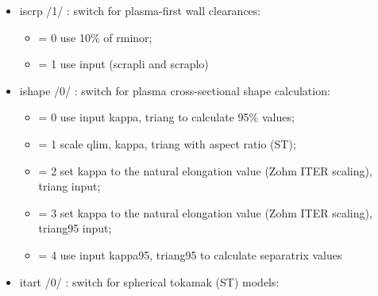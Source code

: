 \documentclass[]{article}
\providecommand{\tightlist}{%
  \setlength{\itemsep}{0pt}\setlength{\parskip}{0pt}}
\begin{document}
\begin{itemize}
\begin{itemize}
    (33) IPB98(y,1) (H-mode)
  \item
    (34) IPB98(y,2) (H-mode)
  \item
    (35) IPB98(y,3) (H-mode)
  \item
    (36) IPB98(y,4) (H-mode)
  \item
    (37) ISS95 (stellarator)
  \item
    (38) ISS04 (stellarator)
  \item
    (39) DS03 (H-mode)
  \item
    (40) Murari et al non-power law (H-mode)
  \item
    (41) Petty 2008 (H-mode)
  \item
    (42) Lang et al. 2012 (H-mode)
  \item
    (43) Hubbard 2017 (I-mode) - nominal
  \item
    (44) Hubbard 2017 (I-mode) - lower bound
  \item
    (45) Hubbard 2017 (I-mode) - upper bound
  \item
    (46) NSTX (H-mode; Spherical tokamak)
  \item
    (47) NSTX-Petty08 Hybrid (H-mode)
  \item
    (48) Use input tauee\_in
  \end{itemize}
\item
  iscrp /1/ : switch for plasma-first wall clearances:

  \begin{itemize}
  \tightlist
  \item
    = 0 use 10\% of rminor;
  \item
    = 1 use input (scrapli and scraplo)
  \end{itemize}
\item
  ishape /0/ : switch for plasma cross-sectional shape calculation:

  \begin{itemize}
  \tightlist
  \item
    = 0 use input kappa, triang to calculate 95\% values;
  \item
    = 1 scale qlim, kappa, triang with aspect ratio (ST);
  \item
    = 2 set kappa to the natural elongation value (Zohm ITER scaling),
    triang input;
  \item
    = 3 set kappa to the natural elongation value (Zohm ITER scaling),
    triang95 input;
  \item
    = 4 use input kappa95, triang95 to calculate separatrix values
  \end{itemize}
\item
  itart /0/ : switch for spherical tokamak (ST) models:


\end{itemize}
\end{document}
